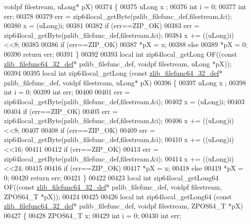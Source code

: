 \begin{DoxyCode}
      voidpf filestream, uLong* pX)
00374 \{
00375     uLong x ;
00376     \textcolor{keywordtype}{int} i = 0;
00377     \textcolor{keywordtype}{int} err;
00378 
00379     err = zip64local\_getByte(pzlib\_filefunc\_def,filestream,&i);
00380     x = (uLong)i;
00381 
00382     \textcolor{keywordflow}{if} (err==ZIP\_OK)
00383         err = zip64local\_getByte(pzlib\_filefunc\_def,filestream,&i);
00384     x += ((uLong)i)<<8;
00385 
00386     \textcolor{keywordflow}{if} (err==ZIP\_OK)
00387         *pX = x;
00388     \textcolor{keywordflow}{else}
00389         *pX = 0;
00390     \textcolor{keywordflow}{return} err;
00391 \}
00392 
00393 local \textcolor{keywordtype}{int} zip64local\_getLong OF((\textcolor{keyword}{const} \hyperlink{structzlib__filefunc64__32__def__s}{zlib\_filefunc64\_32\_def}* pzlib\_filefunc\_def, 
      voidpf filestream, uLong *pX));
00394 
00395 local \textcolor{keywordtype}{int} zip64local\_getLong (\textcolor{keyword}{const} \hyperlink{structzlib__filefunc64__32__def__s}{zlib\_filefunc64\_32\_def}* pzlib\_filefunc\_def, 
      voidpf filestream, uLong* pX)
00396 \{
00397     uLong x ;
00398     \textcolor{keywordtype}{int} i = 0;
00399     \textcolor{keywordtype}{int} err;
00400 
00401     err = zip64local\_getByte(pzlib\_filefunc\_def,filestream,&i);
00402     x = (uLong)i;
00403 
00404     \textcolor{keywordflow}{if} (err==ZIP\_OK)
00405         err = zip64local\_getByte(pzlib\_filefunc\_def,filestream,&i);
00406     x += ((uLong)i)<<8;
00407 
00408     \textcolor{keywordflow}{if} (err==ZIP\_OK)
00409         err = zip64local\_getByte(pzlib\_filefunc\_def,filestream,&i);
00410     x += ((uLong)i)<<16;
00411 
00412     \textcolor{keywordflow}{if} (err==ZIP\_OK)
00413         err = zip64local\_getByte(pzlib\_filefunc\_def,filestream,&i);
00414     x += ((uLong)i)<<24;
00415 
00416     \textcolor{keywordflow}{if} (err==ZIP\_OK)
00417         *pX = x;
00418     \textcolor{keywordflow}{else}
00419         *pX = 0;
00420     \textcolor{keywordflow}{return} err;
00421 \}
00422 
00423 local \textcolor{keywordtype}{int} zip64local\_getLong64 OF((\textcolor{keyword}{const} \hyperlink{structzlib__filefunc64__32__def__s}{zlib\_filefunc64\_32\_def}* pzlib\_filefunc\_def, 
      voidpf filestream, ZPOS64\_T *pX));
00424 
00425 
00426 local \textcolor{keywordtype}{int} zip64local\_getLong64 (\textcolor{keyword}{const} \hyperlink{structzlib__filefunc64__32__def__s}{zlib\_filefunc64\_32\_def}* pzlib\_filefunc\_def, 
      voidpf filestream, ZPOS64\_T *pX)
00427 \{
00428   ZPOS64\_T x;
00429   \textcolor{keywordtype}{int} i = 0;
00430   \textcolor{keywordtype}{int} err;

\end{DoxyCode}

